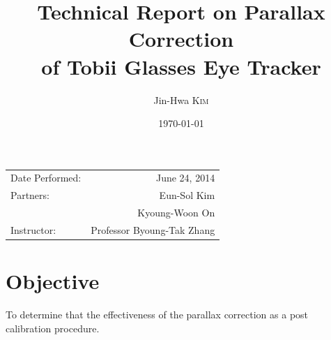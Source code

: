 \documentclass{article}
\title{Technical Report on Parallax Correction \\
of Tobii Glasses Eye Tracker} %
\author{Jin-Hwa \textsc{Kim}} %
\date{\today} %
\begin{document}
\maketitle %

\begin{center}
\begin{tabular}{l r}
Date Performed: & June 24, 2014 \\ %
Partners: & Eun-Sol Kim \\ %
& Kyoung-Woon On \\
Instructor: & Professor Byoung-Tak Zhang %
\end{tabular}
\end{center}



\section{Objective}

To determine that the effectiveness of the parallax correction as a post calibration procedure. 

\end{document}
